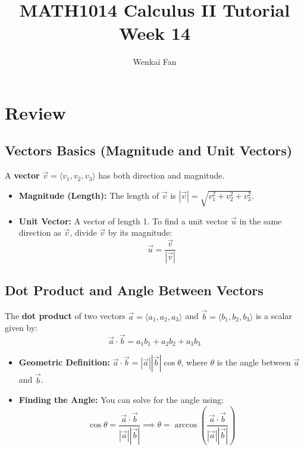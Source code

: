\documentclass[11pt]{article}
\title{\vspace{-1.0em}MATH1014 Calculus II Tutorial\\Week 14}
\author{Wenkai Fan}
\date{}
\theoremstyle{definition}
\begin{document}
\maketitle
\thispagestyle{fancy}

\section{Review}

\subsection{Vectors Basics (Magnitude and Unit Vectors)}
A \textbf{vector} $\vec{v} = \langle v_1, v_2, v_3 \rangle$ has both direction and magnitude.
\begin{itemize}
    \item \textbf{Magnitude (Length):} The length of $\vec{v}$ is $|\vec{v}| = \sqrt{v_1^2 + v_2^2 + v_3^2}$.
    \item \textbf{Unit Vector:} A vector of length 1. To find a unit vector $\vec{u}$ in the same direction as $\vec{v}$, divide $\vec{v}$ by its magnitude:
    \[ \vec{u} = \frac{\vec{v}}{|\vec{v}|} \]
\end{itemize}

\subsection{Dot Product and Angle Between Vectors}
The \textbf{dot product} of two vectors $\vec{a} = \langle a_1, a_2, a_3 \rangle$ and $\vec{b} = \langle b_1, b_2, b_3 \rangle$ is a scalar given by:
\[ \vec{a} \cdot \vec{b} = a_1b_1 + a_2b_2 + a_3b_3 \]
\begin{itemize}
    \item \textbf{Geometric Definition:} $\vec{a} \cdot \vec{b} = |\vec{a}| |\vec{b}| \cos \theta$, where $\theta$ is the angle between $\vec{a}$ and $\vec{b}$.
    \item \textbf{Finding the Angle:} You can solve for the angle using:
    \[ \cos \theta = \frac{\vec{a} \cdot \vec{b}}{|\vec{a}| |\vec{b}|} \implies \theta = \arccos \left( \frac{\vec{a} \cdot \vec{b}}{|\vec{a}| |\vec{b}|} \right) \]
\end{itemize}
\end{document}
